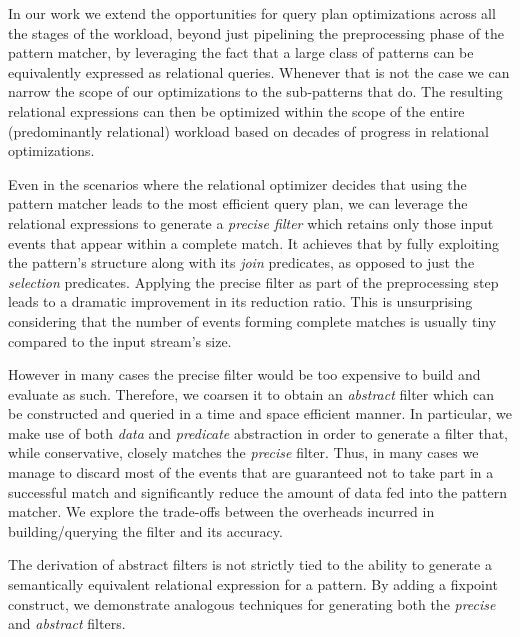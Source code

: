 In our work we extend the opportunities for query plan optimizations across all 
the stages of the workload, beyond just pipelining the preprocessing phase of 
the pattern matcher, by leveraging the fact that a large class of patterns can 
be equivalently expressed as relational queries.
Whenever that is not the case we can narrow the scope of our optimizations to 
the sub-patterns that do.
The resulting relational expressions can then be optimized within the scope of 
the entire (predominantly relational) workload based on decades of progress in 
relational optimizations.  


Even in the scenarios where the relational optimizer decides that using the 
pattern matcher leads to the most efficient query plan, we can leverage the 
relational expressions to generate a {\em precise filter} which retains only 
those input events that appear within a complete match. 
It achieves that by fully exploiting the pattern's structure along with its 
{\em join} predicates, as opposed to just the {\em selection} predicates.   
Applying the precise filter as part of the preprocessing step leads to a 
dramatic improvement in its reduction ratio. 
This is unsurprising considering that the number of events forming complete 
matches is usually tiny compared to the input stream's size.
 

However in many cases the precise filter would be too expensive to build and 
evaluate as such.
Therefore, we coarsen it to obtain an {\em abstract} filter
which can be constructed and queried in a time and space efficient manner.
In particular, we make use of both {\em data} and {\em predicate} 
abstraction in order to generate a filter that, while conservative, closely 
matches the {\em precise} filter. 
Thus, in many cases we manage to discard most of the events that are guaranteed 
not to take part in a successful match and significantly reduce the amount of 
data fed into the pattern matcher.
We explore the trade-offs between the overheads incurred in building/querying
the filter and its accuracy. 


The derivation of abstract filters is not strictly tied to the ability to 
generate a semantically equivalent relational expression for a pattern. 
By adding a fixpoint construct, we demonstrate analogous techniques for 
generating both the {\em precise} and {\em abstract} filters.

